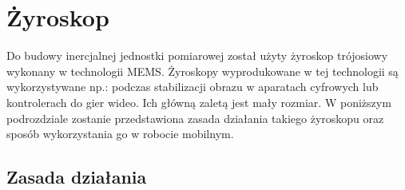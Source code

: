 \section{Żyroskop}
Do budowy inercjalnej jednostki pomiarowej został użyty żyroskop trójosiowy
wykonany w technologii MEMS. Żyroskopy wyprodukowane w tej technologii są
wykorzystywane np.: podczas stabilizacji obrazu w aparatach cyfrowych lub
kontrolerach do gier wideo. Ich główną zaletą jest mały rozmiar. W poniższym
podrozdziale zostanie  przedstawiona zasada działania takiego żyroskopu oraz
sposób wykorzystania go w robocie mobilnym.

\subsection{Zasada działania}

